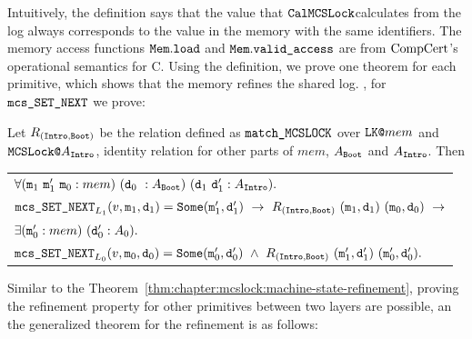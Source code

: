Intuitively, the definition says that the value that
${\mathrm{\texttt{CalMCSLock}}}$calculates from the log always corresponds to the value 
in the memory with the same identifiers. The memory access functions ${\mathrm{\texttt{Mem}}} . {\mathrm{\texttt{load}}}$ and ${\mathrm{\texttt{Mem}}} . {\mathrm{\texttt{valid\_access}}}$ are
from $\mathrm{CompCert}$'s operational semantics for C.
Using the definition, we prove one theorem for each primitive, which
shows that the memory refines the shared log. \eg, for ${\mathrm{\texttt{mcs\_SET\_NEXT}}}$ we prove:

\begin{theorem}
    \label{thm:chapter:mcslock:machine-state-refinement} Let $R_{({\mathrm{\texttt{Intro}}}, {\mathrm{\texttt{Boot}}})}$ be the relation defined as ${\mathrm{\texttt{match\_MCSLOCK}}}$
    over ${\mathrm{\texttt{LK@}}}mem$ and ${\mathrm{\texttt{MCSLock}}}{\mathrm{\texttt{@}}}A_{{\mathrm{\texttt{Intro}}}}$, 
identity relation for other parts of $mem$, $A_{{\mathrm{\texttt{Boot}}}}$ and $A_{{\mathrm{\texttt{Intro}}}}$. Then\newline
 \begin{tabular}{P{0.95\textwidth}}
$ \forall (\codeinmath{{m}}_{1} \ \codeinmath{{m}}_{1}'\ \codeinmath{{m}}_{0} : mem)\  (\codeinmath{{d}}_{0} \ : A_{\mmcsboot})\ (\codeinmath{{d}}_{1} \ \codeinmath{{d}}_{1}' : A_{\mmcslockintro}). $ \\
$ \mcssetnext_{L_1}(v, \codeinmath{{m}}_1, \codeinmath{{d}}_1) = \Some (\codeinmath{{m}}'_1, \codeinmath{{d}}'_1) \ \rightarrow \
  R_{(\mmcslockintro, \mmcsboot)}\ (\codeinmath{{m}}_1, \codeinmath{{d}}_1)\ (\codeinmath{{m}}_0, \codeinmath{{d}}_0) \ \rightarrow $\\
  $ \exists ({\mathrm{\texttt{{m}}}}_{0}' : mem)\ ({\mathrm{\texttt{{d}}}}_{0}' : A_0).$ \\
  $  \mcssetnext_{L_0}(v, \codeinmath{{m}}_0, \codeinmath{{d}}_0) = \Some(\codeinmath{{m}}'_0, \codeinmath{{d}}'_0) \ \wedge \
  R_{(\mmcslockintro, \mmcsboot)}\ (\codeinmath{{m}}'_1, \codeinmath{{d}}'_1)\ (\codeinmath{{m}}'_0, \codeinmath{{d}}'_0).$ 
   \end{tabular}
\end{theorem}
Similar to the Theorem~\ref{thm:chapter:mcslock:machine-state-refinement},
proving the refinement property for other primitives between two layers 
are possible, an the generalized theorem for the refinement is as follows:


